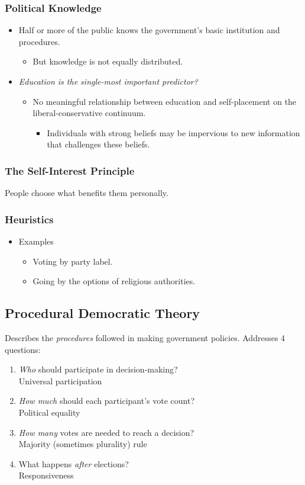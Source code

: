 \subsubsection{Political Knowledge}
\begin{itemize}
    \item Half or more of the public knows the government's basic institution and procedures.
    \begin{itemize}
        \item But knowledge is not equally distributed.
    \end{itemize}
    \item \textit{Education is the single-most important predictor?}
    \begin{itemize}
        \item No meaningful relationship between education and self-placement on the liberal-conservative continuum.
        \begin{itemize}
            \item Individuals with strong beliefs may be impervious to new information that challenges these beliefs.
        \end{itemize} 
    \end{itemize}
\end{itemize}
\subsubsection{The Self-Interest Principle}
People choose what benefits them personally.
\subsubsection{Heuristics}
\begin{itemize}
    \item Examples
    \begin{itemize}
        \item Voting by party label.
        \item Going by the options of religious authorities.
    \end{itemize}
\end{itemize}

\subsection{Procedural Democratic Theory}
Describes the \textit{procedures} followed in making government policies. Addresses 4 questions:
\begin{enumerate}
    \item \textit{Who} should participate in decision-making? \\ Universal participation
    \item \textit{How much} should each participant's vote count? \\ Political equality
    \item \textit{How many} votes are needed to reach a decision? \\ Majority (sometimes plurality) rule
    \item What happens \textit{after} elections? \\ Responsiveness
\end{enumerate}
